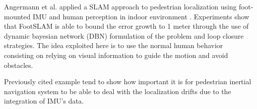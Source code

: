Angermann et al. applied a SLAM approach to pedestrian localization using foot-mounted IMU and human perception in indoor environment \cite{angermann2012footslam}. Experiments show that
FootSLAM is able to bound the error growth to 1 meter through the use of dynamic bayesian network (DBN) formulation of the problem and loop closure strategies. The idea exploited here is to use the normal human behavior 
consisting on relying on visual information to guide the motion and avoid obstacles. 

Previously cited example tend to show how important it is for pedestrian inertial navigation system to be able to deal with the localization drifts due to the integration of IMU's data. 
